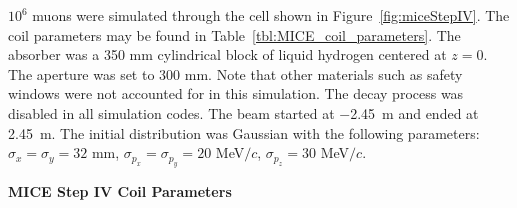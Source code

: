 \documentclass{jacow}
\begin{document}
$10^6$ muons were simulated through the cell shown in Figure~\ref{fig:miceStepIV}. The coil parameters may be found in Table~\ref{tbl:MICE_coil_parameters}. The absorber was a 350 mm cylindrical block of liquid hydrogen centered at $z=0$. The aperture was set to 300 mm. Note that other materials such as safety windows were not accounted for in this simulation. The decay process was disabled in all simulation codes. The beam started at $-$2.45~m and ended at 2.45~m. The initial distribution was Gaussian with the following parameters: $\sigma_x=\sigma_y=32$ mm, $\sigma_{p_x}=\sigma_{p_y}=20$ MeV$/c$, $\sigma_{p_z}=30$ MeV$/c$. %

\begin{table}
\caption*{\textbf{MICE Step IV Coil Parameters}}
\caption[MICE Step IV coil parameters.]{MICE Step IV coil parameters.} %
\label{tbl:MICE_coil_parameters}
\end{table}

\end{document}
